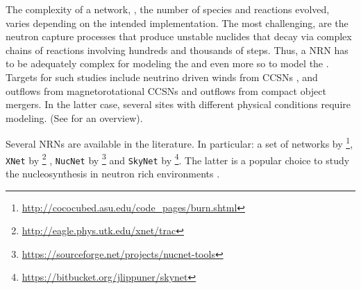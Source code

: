 The complexity of a network, \ie, the number of species and reactions evolved, 
varies depending on the intended implementation. 
%
%
%
%
The most challenging, are the neutron capture processes that produce unstable 
nuclides that decay via complex chains of reactions 
involving hundreds and thousands of steps. 
%
Thus, a \ac{NRN} has to be adequately complex for modeling 
the \sproc{} \citep[\eg][]{Prantzos:1990,Kaeppeler:2011,Nishimura:2017zdi} 
and even more so to model the \rproc{}. 
%
Targets for such studies include neutrino driven winds from 
\acp{CCSN} \citep[\eg][]{Woosley:1992,Arcones:2010,Wanajo:2013},
and outflows from magnetorotational \acp{CCSN} \citep[\eg][]{Winteler:2012,Nishimura:2015nca} and 
outflows from compact object mergers. In the latter case, 
several sites with different physical conditions 
require modeling. %
%
(See \citet{Lippuner:2018phd} for an overview).

Several \acp{NRN} are available in the literature. 
In particular: a set of networks by 
\citet{Timmes:1999}\footnote{\url{http://cococubed.asu.edu/code_pages/burn.shtml}}, 
\texttt{XNet} by \citet{Hix:1999}\footnote{\url{http://eagle.phys.utk.edu/xnet/trac}} , 
\texttt{NucNet} by \citet{Meyer:2007}\footnote{\url{https://sourceforge.net/projects/nucnet-tools}}
and \texttt{SkyNet} by \citet{Lippuner:2015gwa}\footnote{\url{https://bitbucket.org/jlippuner/skynet}}.
%
The latter is a popular choice to study the nucleosynthesis 
in neutron rich environments 
\citep[\eg][]{Lippuner:2015gwa,Radice:2016dwd,Radice:2018pdn}. 


